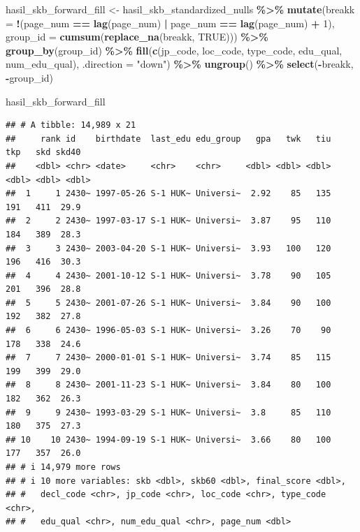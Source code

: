 \documentclass[
]{article}
\newenvironment{Shaded}{\begin{snugshade}}{\end{snugshade}}
\newcommand{\AttributeTok}[1]{\textcolor[rgb]{0.13,0.29,0.53}{#1}}
\newcommand{\ConstantTok}[1]{\textcolor[rgb]{0.56,0.35,0.01}{#1}}
\newcommand{\DecValTok}[1]{\textcolor[rgb]{0.00,0.00,0.81}{#1}}
\newcommand{\FunctionTok}[1]{\textcolor[rgb]{0.13,0.29,0.53}{\textbf{#1}}}
\newcommand{\NormalTok}[1]{#1}
\newcommand{\OtherTok}[1]{\textcolor[rgb]{0.56,0.35,0.01}{#1}}
\newcommand{\SpecialCharTok}[1]{\textcolor[rgb]{0.81,0.36,0.00}{\textbf{#1}}}
\newcommand{\StringTok}[1]{\textcolor[rgb]{0.31,0.60,0.02}{#1}}
\begin{document}
\begin{Shaded}
\begin{Highlighting}[]
\NormalTok{hasil\_skb\_forward\_fill }\OtherTok{\textless{}{-}}\NormalTok{ hasil\_skb\_standardized\_nulls }\SpecialCharTok{\%\textgreater{}\%} 
  \FunctionTok{mutate}\NormalTok{(}\AttributeTok{breakk =} \SpecialCharTok{!}\NormalTok{(page\_num }\SpecialCharTok{==} \FunctionTok{lag}\NormalTok{(page\_num) }\SpecialCharTok{|}\NormalTok{ page\_num }\SpecialCharTok{==} \FunctionTok{lag}\NormalTok{(page\_num) }\SpecialCharTok{+} \DecValTok{1}\NormalTok{),}
         \AttributeTok{group\_id =} \FunctionTok{cumsum}\NormalTok{(}\FunctionTok{replace\_na}\NormalTok{(breakk, }\ConstantTok{TRUE}\NormalTok{))) }\SpecialCharTok{\%\textgreater{}\%}
  \FunctionTok{group\_by}\NormalTok{(group\_id) }\SpecialCharTok{\%\textgreater{}\%} 
  \FunctionTok{fill}\NormalTok{(}\FunctionTok{c}\NormalTok{(jp\_code, loc\_code, type\_code, edu\_qual, num\_edu\_qual), }\AttributeTok{.direction =} \StringTok{"down"}\NormalTok{) }\SpecialCharTok{\%\textgreater{}\%} 
  \FunctionTok{ungroup}\NormalTok{() }\SpecialCharTok{\%\textgreater{}\%} 
  \FunctionTok{select}\NormalTok{(}\SpecialCharTok{{-}}\NormalTok{breakk, }\SpecialCharTok{{-}}\NormalTok{group\_id)}

\NormalTok{hasil\_skb\_forward\_fill}
\end{Highlighting}
\end{Shaded}

\begin{verbatim}
## # A tibble: 14,989 x 21
##     rank id    birthdate  last_edu edu_group   gpa   twk   tiu   tkp   skd skd40
##    <dbl> <chr> <date>     <chr>    <chr>     <dbl> <dbl> <dbl> <dbl> <dbl> <dbl>
##  1     1 2430~ 1997-05-26 S-1 HUK~ Universi~  2.92    85   135   191   411  29.9
##  2     2 2430~ 1997-03-17 S-1 HUK~ Universi~  3.87    95   110   184   389  28.3
##  3     3 2430~ 2003-04-20 S-1 HUK~ Universi~  3.93   100   120   196   416  30.3
##  4     4 2430~ 2001-10-12 S-1 HUK~ Universi~  3.78    90   105   201   396  28.8
##  5     5 2430~ 2001-07-26 S-1 HUK~ Universi~  3.84    90   100   192   382  27.8
##  6     6 2430~ 1996-05-03 S-1 HUK~ Universi~  3.26    70    90   178   338  24.6
##  7     7 2430~ 2000-01-01 S-1 HUK~ Universi~  3.74    85   115   199   399  29.0
##  8     8 2430~ 2001-11-23 S-1 HUK~ Universi~  3.84    80   100   182   362  26.3
##  9     9 2430~ 1993-03-29 S-1 HUK~ Universi~  3.8     85   110   180   375  27.3
## 10    10 2430~ 1994-09-19 S-1 HUK~ Universi~  3.66    80   100   177   357  26.0
## # i 14,979 more rows
## # i 10 more variables: skb <dbl>, skb60 <dbl>, final_score <dbl>,
## #   decl_code <chr>, jp_code <chr>, loc_code <chr>, type_code <chr>,
## #   edu_qual <chr>, num_edu_qual <chr>, page_num <dbl>
\end{verbatim}
\end{document}

